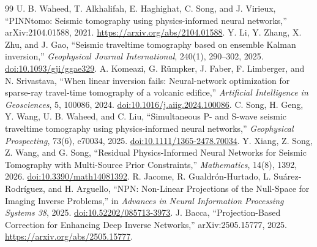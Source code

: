 \documentclass[11pt]{article}
\begin{document}
{\begin{thebibliography}{99}
 U. B. Waheed, T. Alkhalifah, E. Haghighat, C. Song, and J. Virieux, ``PINNtomo: Seismic tomography using physics-informed neural networks,'' arXiv:2104.01588, 2021. \url{https://arxiv.org/abs/2104.01588}.
 Y. Li, Y. Zhang, X. Zhu, and J. Gao, ``Seismic traveltime tomography based on ensemble Kalman inversion,'' \emph{Geophysical Journal International}, 240(1), 290--302, 2025. \href{https://doi.org/10.1093/gji/ggae329}{doi:10.1093/gji/ggae329}.
 A. Komeazi, G. R\"umpker, J. Faber, F. Limberger, and N. Srivastava, ``When linear inversion fails: Neural-network optimization for sparse-ray travel-time tomography of a volcanic edifice,'' \emph{Artificial Intelligence in Geosciences}, 5, 100086, 2024. \href{https://doi.org/10.1016/j.aiig.2024.100086}{doi:10.1016/j.aiig.2024.100086}.
 C. Song, H. Geng, Y. Wang, U. B. Waheed, and C. Liu, ``Simultaneous P- and S-wave seismic traveltime tomography using physics-informed neural networks,'' \emph{Geophysical Prospecting}, 73(6), e70034, 2025. \href{https://doi.org/10.1111/1365-2478.70034}{doi:10.1111/1365-2478.70034}.
 Y. Xiang, Z. Song, Z. Wang, and G. Song, ``Residual Physics-Informed Neural Networks for Seismic Tomography with Multi-Source Prior Constraints,'' \emph{Mathematics}, 14(8), 1392, 2026. \href{https://doi.org/10.3390/math14081392}{doi:10.3390/math14081392}.
 R. Jacome, R. Gualdr\'on-Hurtado, L. Su\'arez-Rodr\'iguez, and H. Arguello, ``NPN: Non-Linear Projections of the Null-Space for Imaging Inverse Problems,'' in \emph{Advances in Neural Information Processing Systems 38}, 2025. \href{https://doi.org/10.52202/085713-3973}{doi:10.52202/085713-3973}.
 J. Bacca, ``Projection-Based Correction for Enhancing Deep Inverse Networks,'' arXiv:2505.15777, 2025. \url{https://arxiv.org/abs/2505.15777}.
\end{thebibliography}
}
\end{document}
